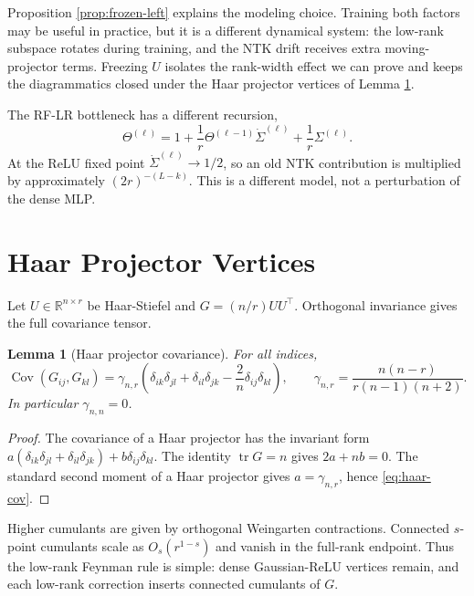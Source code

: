 \documentclass{article}
\newtheorem{lemma}[theorem]{Lemma}
\newcommand{\R}{\mathbb R}
\newcommand{\Cov}{\operatorname{Cov}}
\newcommand{\tr}{\operatorname{tr}}
\begin{document}
Proposition \ref{prop:frozen-left} explains the modeling choice. Training both factors may be useful in practice, but it is a different dynamical system: the low-rank subspace rotates during training, and the NTK drift receives extra moving-projector terms. Freezing \(U\) isolates the rank-width effect we can prove and keeps the diagrammatics closed under the Haar projector vertices of Lemma \ref{lem:haar-cov}.

The RF-LR bottleneck has a different recursion,
\begin{equation}
\Theta^{(\ell)}=1+\frac1r\Theta^{(\ell-1)}\dot\Sigma^{(\ell)}+\frac1r\Sigma^{(\ell)}.
\label{eq:rflr-recursion}
\end{equation}
At the ReLU fixed point \(\dot\Sigma^{(\ell)}\to1/2\), so an old NTK contribution is multiplied by approximately \((2r)^{-(L-k)}\). This is a different model, not a perturbation of the dense MLP.

\section{Haar Projector Vertices}
Let \(U\in\R^{n\times r}\) be Haar-Stiefel and \(G=(n/r)UU^\top\). Orthogonal invariance gives the full covariance tensor.

\begin{lemma}[Haar projector covariance]
\label{lem:haar-cov}
For all indices,
\begin{equation}
\Cov(G_{ij},G_{kl})=\gamma_{n,r}\left(\delta_{ik}\delta_{jl}+\delta_{il}\delta_{jk}-\frac2n\delta_{ij}\delta_{kl}\right),
\qquad
\gamma_{n,r}=\frac{n(n-r)}{r(n-1)(n+2)}.
\label{eq:haar-cov}
\end{equation}
In particular \(\gamma_{n,n}=0\).
\end{lemma}

\begin{proof}
The covariance of a Haar projector has the invariant form \(a(\delta_{ik}\delta_{jl}+\delta_{il}\delta_{jk})+b\delta_{ij}\delta_{kl}\). The identity \(\tr G=n\) gives \(2a+nb=0\). The standard second moment of a Haar projector gives \(a=\gamma_{n,r}\), hence \eqref{eq:haar-cov}.
\end{proof}

Higher cumulants are given by orthogonal Weingarten contractions. Connected \(s\)-point cumulants scale as \(O_s(r^{1-s})\) and vanish in the full-rank endpoint. Thus the low-rank Feynman rule is simple: dense Gaussian-ReLU vertices remain, and each low-rank correction inserts connected cumulants of \(G\).
\end{document}
